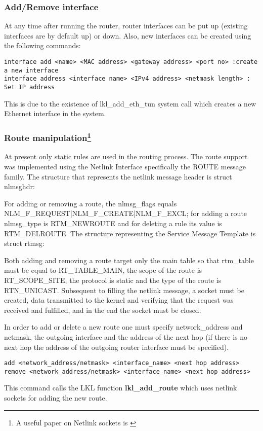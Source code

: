 {{\subsubsection{Add/Remove interface}
At any time after running the router, router interfaces can be put up (existing interfaces are by default up) or down. Also, new interfaces can be created using the following commands:
\lstset{language=TeX,caption=Adding a new interface,label=lst:saddrule}
\begin{lstlisting}
interface add <name> <MAC address> <gateway address> <port no> :create a new interface
interface address <interface name> <IPv4 address> <netmask length> : Set IP address 
\end{lstlisting}  
This is due to the existence of lkl_add_eth_tun system call which creates a new Ethernet interface in the system.
 
\subsubsection[Route manipulation]{Route manipulation\footnote{A useful paper on Netlink sockets is \cite{netlinksockets}}}
At present only static rules are used in the routing process.
The route support was implemented using the Netlink Interface specifically the ROUTE message family.
The structure that represents the netlink message header is struct nlmsghdr:
\lstset{language=C, caption=Netlink Message Header Structure}

For adding or removing a route, the nlmsg_flags equals NLM_F_REQUEST|NLM_F_CREATE|NLM_F_EXCL; for adding a route nlmsg_type is RTM_NEWROUTE and for deleting a rule its value is RTM_DELROUTE. 
The structure representing the Service Message Template is struct rtmsg:
\lstset{language=C, caption=Service Message Template Structure}

Both adding and removing a route target only the main table so that rtm_table must be equal to RT_TABLE_MAIN, the scope of the route is RT_SCOPE_SITE, the protocol is static and the type of the route is RTN_UNICAST.
Subsequent to filling the netlink message, a socket must be created, data transmitted to the kernel and verifying that the request was received and fulfilled, and in the end the socket must be closed.
\lstset{language=C, caption=Communicating with the kernel}
  

In order to add or delete a new route one must specify network_address and netmask, the outgoing interface and the address of the next hop (if there is no next hop the address of the outgoing router interface must be specified).
\lstset{language=TeX,caption=Adding a new interface,label=lst:saddrule}
\begin{lstlisting}
add <network_address/netmask> <interface_name> <next hop address>
remove <network_address/netmask> <interface_name> <next hop address>
\end{lstlisting}  
This command calls the LKL function {\bf lkl_add_route} which uses netlink sockets for adding the new route.

}}
